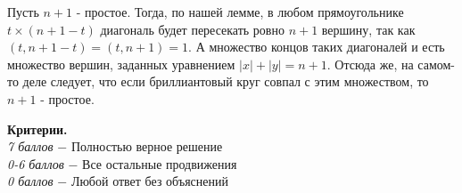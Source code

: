     Пусть $n+1$ - простое. Тогда, по нашей лемме, в любом прямоугольнике $t \times (n + 1 - t)$ диагональ будет пересекать ровно $n+1$ вершину, так как $(t, n+1 - t) = (t, n+1) = 1$. А множество концов таких диагоналей и есть множество вершин, заданных уравнением $|x| + |y| = n + 1$. Отсюда же, на самом-то деле следует, что если бриллиантовый круг совпал с этим множеством, то $n+1$ - простое.

    \textbf{Критерии.} \\
\textit{7 баллов} $-$ Полностью верное решение\\
\textit{0-6 баллов} $-$ Все остальные продвижения\\
\textit{0 баллов} $-$ Любой ответ без объяснений\\